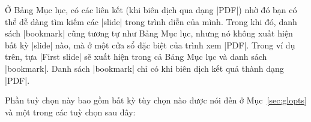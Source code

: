 Ở Bảng Mục lục, có các liên kết (khi biên dịch qua dạng |PDF|) nhờ đó
bạn có thể dễ dàng tìm kiếm các |slide| trong trình diễn của mình.
Trong khi đó, danh sách |bookmark| cũng tương tự như Bảng Mục lục, nhưng
nó không xuất hiện bất kỳ |slide| nào, mà ở một cửa sổ đặc biệt của trình
xem |PDF|. Trong ví dụ trên, tựa |First slide| sẽ xuất hiện trong cả
Bảng Mục lục và danh sách |bookmark|. Danh sách |bookmark| chỉ có khi
biên dịch kết quả thành dạng |PDF|.

Phần tuỳ chọn này bao gồm bất kỳ tùy chọn nào được nói đến ở Mục~\vref{sec:glopts}
và một trong các tuỳ chọn sau đây:

